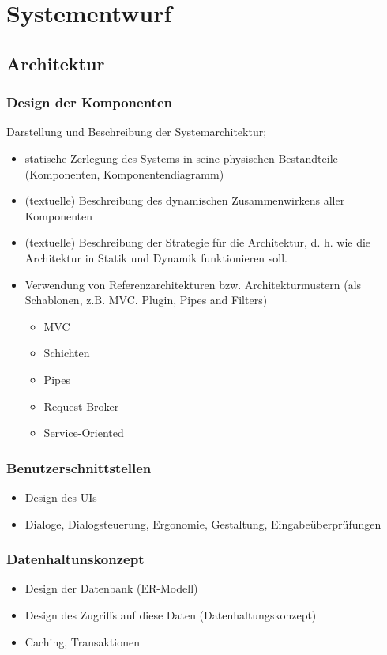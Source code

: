 \chapter{Systementwurf}

\section{Architektur}

\subsection{Design der Komponenten}

Darstellung und Beschreibung der Systemarchitektur;

\begin{itemize}
	\item  statische Zerlegung des Systems in seine physischen Bestandteile (Komponenten, Komponentendiagramm)
	\item (textuelle) Beschreibung des dynamischen Zusammenwirkens aller Komponenten 
	\item (textuelle) Beschreibung der Strategie für die Architektur, d. h. wie die Architektur in Statik und Dynamik funktionieren soll.
	\item Verwendung von Referenzarchitekturen bzw. Architekturmustern (als Schablonen, z.B. MVC. Plugin, Pipes and Filters)
	\begin{itemize}
		\item MVC
		\item Schichten
		\item Pipes
		\item Request Broker
		\item Service-Oriented
	\end{itemize}
\end{itemize}

\subsection{Benutzerschnittstellen} 
\begin{itemize}
	\item Design des UIs
	\item Dialoge, Dialogsteuerung, Ergonomie, Gestaltung, Eingabeüberprüfungen
\end{itemize}

\subsection{Datenhaltunskonzept}
\begin{itemize}
	\item Design der Datenbank (ER-Modell)
	\item Design des Zugriffs auf diese Daten (Datenhaltungskonzept)
	\item Caching, Transaktionen
\end{itemize}

